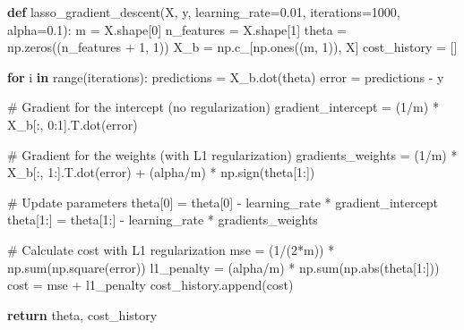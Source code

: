 \documentclass[
  letterpaper,
  DIV=11,
  numbers=noendperiod]{scrreprt}
\newenvironment{Shaded}{\begin{snugshade}}{\end{snugshade}}
\newcommand{\BuiltInTok}[1]{\textcolor[rgb]{0.00,0.23,0.31}{#1}}
\newcommand{\CommentTok}[1]{\textcolor[rgb]{0.37,0.37,0.37}{#1}}
\newcommand{\ControlFlowTok}[1]{\textcolor[rgb]{0.00,0.23,0.31}{\textbf{#1}}}
\newcommand{\DecValTok}[1]{\textcolor[rgb]{0.68,0.00,0.00}{#1}}
\newcommand{\FloatTok}[1]{\textcolor[rgb]{0.68,0.00,0.00}{#1}}
\newcommand{\KeywordTok}[1]{\textcolor[rgb]{0.00,0.23,0.31}{\textbf{#1}}}
\newcommand{\NormalTok}[1]{\textcolor[rgb]{0.00,0.23,0.31}{#1}}
\newcommand{\OperatorTok}[1]{\textcolor[rgb]{0.37,0.37,0.37}{#1}}
\begin{document}
\begin{Shaded}
\begin{Highlighting}[]
\KeywordTok{def}\NormalTok{ lasso\_gradient\_descent(X, y, learning\_rate}\OperatorTok{=}\FloatTok{0.01}\NormalTok{, iterations}\OperatorTok{=}\DecValTok{1000}\NormalTok{, alpha}\OperatorTok{=}\FloatTok{0.1}\NormalTok{):}
\NormalTok{    m }\OperatorTok{=}\NormalTok{ X.shape[}\DecValTok{0}\NormalTok{]}
\NormalTok{    n\_features }\OperatorTok{=}\NormalTok{ X.shape[}\DecValTok{1}\NormalTok{]}
\NormalTok{    theta }\OperatorTok{=}\NormalTok{ np.zeros((n\_features }\OperatorTok{+} \DecValTok{1}\NormalTok{, }\DecValTok{1}\NormalTok{))}
\NormalTok{    X\_b }\OperatorTok{=}\NormalTok{ np.c\_[np.ones((m, }\DecValTok{1}\NormalTok{)), X]}
\NormalTok{    cost\_history }\OperatorTok{=}\NormalTok{ []}
    
    \ControlFlowTok{for}\NormalTok{ i }\KeywordTok{in} \BuiltInTok{range}\NormalTok{(iterations):}
\NormalTok{        predictions }\OperatorTok{=}\NormalTok{ X\_b.dot(theta)}
\NormalTok{        error }\OperatorTok{=}\NormalTok{ predictions }\OperatorTok{{-}}\NormalTok{ y}
        
        \CommentTok{\# Gradient for the intercept (no regularization)}
\NormalTok{        gradient\_intercept }\OperatorTok{=}\NormalTok{ (}\DecValTok{1}\OperatorTok{/}\NormalTok{m) }\OperatorTok{*}\NormalTok{ X\_b[:, }\DecValTok{0}\NormalTok{:}\DecValTok{1}\NormalTok{].T.dot(error)}
        
        \CommentTok{\# Gradient for the weights (with L1 regularization)}
\NormalTok{        gradients\_weights }\OperatorTok{=}\NormalTok{ (}\DecValTok{1}\OperatorTok{/}\NormalTok{m) }\OperatorTok{*}\NormalTok{ X\_b[:, }\DecValTok{1}\NormalTok{:].T.dot(error) }\OperatorTok{+}\NormalTok{ (alpha}\OperatorTok{/}\NormalTok{m) }\OperatorTok{*}\NormalTok{ np.sign(theta[}\DecValTok{1}\NormalTok{:])}
        
        \CommentTok{\# Update parameters}
\NormalTok{        theta[}\DecValTok{0}\NormalTok{] }\OperatorTok{=}\NormalTok{ theta[}\DecValTok{0}\NormalTok{] }\OperatorTok{{-}}\NormalTok{ learning\_rate }\OperatorTok{*}\NormalTok{ gradient\_intercept}
\NormalTok{        theta[}\DecValTok{1}\NormalTok{:] }\OperatorTok{=}\NormalTok{ theta[}\DecValTok{1}\NormalTok{:] }\OperatorTok{{-}}\NormalTok{ learning\_rate }\OperatorTok{*}\NormalTok{ gradients\_weights}
        
        \CommentTok{\# Calculate cost with L1 regularization}
\NormalTok{        mse }\OperatorTok{=}\NormalTok{ (}\DecValTok{1}\OperatorTok{/}\NormalTok{(}\DecValTok{2}\OperatorTok{*}\NormalTok{m)) }\OperatorTok{*}\NormalTok{ np.}\BuiltInTok{sum}\NormalTok{(np.square(error))}
\NormalTok{        l1\_penalty }\OperatorTok{=}\NormalTok{ (alpha}\OperatorTok{/}\NormalTok{m) }\OperatorTok{*}\NormalTok{ np.}\BuiltInTok{sum}\NormalTok{(np.}\BuiltInTok{abs}\NormalTok{(theta[}\DecValTok{1}\NormalTok{:]))}
\NormalTok{        cost }\OperatorTok{=}\NormalTok{ mse }\OperatorTok{+}\NormalTok{ l1\_penalty}
\NormalTok{        cost\_history.append(cost)}
        
    \ControlFlowTok{return}\NormalTok{ theta, cost\_history}
\end{Highlighting}
\end{Shaded}
\end{document}
